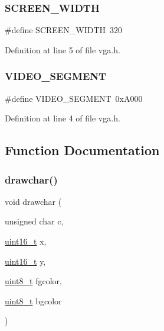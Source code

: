 \subsubsection{\texorpdfstring{S\+C\+R\+E\+E\+N\+\_\+\+W\+I\+D\+TH}{SCREEN\_WIDTH}}
{\footnotesize\ttfamily \#define S\+C\+R\+E\+E\+N\+\_\+\+W\+I\+D\+TH~320}



Definition at line 5 of file vga.\+h.

\mbox{\label{a00011_a818608c80027ef8ff56d31ebaedf58f3_a818608c80027ef8ff56d31ebaedf58f3}} 
\subsubsection{\texorpdfstring{V\+I\+D\+E\+O\+\_\+\+S\+E\+G\+M\+E\+NT}{VIDEO\_SEGMENT}}
{\footnotesize\ttfamily \#define V\+I\+D\+E\+O\+\_\+\+S\+E\+G\+M\+E\+NT~0x\+A000}



Definition at line 4 of file vga.\+h.



\subsection{Function Documentation}
\mbox{\label{a00011_a2c8df7a20b47341b70d97a7ff21d86ea_a2c8df7a20b47341b70d97a7ff21d86ea}} 
\subsubsection{\texorpdfstring{drawchar()}{drawchar()}}
{\footnotesize\ttfamily void drawchar (\begin{DoxyParamCaption}\item[{unsigned char}]{c,  }\item[{\hyperlink{a00047_a273cf69d639a59973b6019625df33e30_a273cf69d639a59973b6019625df33e30}{uint16\+\_\+t}}]{x,  }\item[{\hyperlink{a00047_a273cf69d639a59973b6019625df33e30_a273cf69d639a59973b6019625df33e30}{uint16\+\_\+t}}]{y,  }\item[{\hyperlink{a00047_aba7bc1797add20fe3efdf37ced1182c5_aba7bc1797add20fe3efdf37ced1182c5}{uint8\+\_\+t}}]{fgcolor,  }\item[{\hyperlink{a00047_aba7bc1797add20fe3efdf37ced1182c5_aba7bc1797add20fe3efdf37ced1182c5}{uint8\+\_\+t}}]{bgcolor }\end{DoxyParamCaption})}



